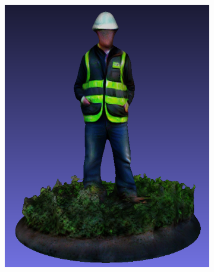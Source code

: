 \begin{figure}[H]
\begin{subfigure}[b]{0.2567\textwidth}
        \includegraphics[width=\textwidth]{figures/future/bias_engineer_genie_2.png}
        \caption{}
    \end{subfigure}
    \begin{subfigure}[b]{0.198\textwidth}
        \centering

\end{subfigure}
\end{figure}
